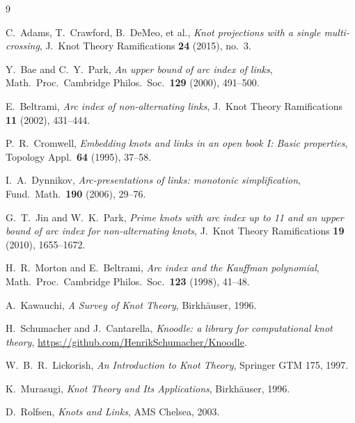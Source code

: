 \documentclass[11pt,oneside]{report}
\theoremstyle{definition}
\begin{document}
\begin{thebibliography}{9}

C.~Adams, T.~Crawford, B.~DeMeo, et al.,
\emph{Knot projections with a single multi-crossing},
J.\ Knot Theory Ramifications \textbf{24} (2015), no.~3.

Y.~Bae and C.~Y.~Park,
\emph{An upper bound of arc index of links},
Math.\ Proc.\ Cambridge Philos.\ Soc.\ \textbf{129} (2000), 491--500.

E.~Beltrami,
\emph{Arc index of non-alternating links},
J.\ Knot Theory Ramifications \textbf{11} (2002), 431--444.

P.~R.~Cromwell,
\emph{Embedding knots and links in an open book I: Basic properties},
Topology Appl.\ \textbf{64} (1995), 37--58.

I.~A.~Dynnikov,
\emph{Arc-presentations of links: monotonic simplification},
Fund.\ Math.\ \textbf{190} (2006), 29--76.

G.~T.~Jin and W.~K.~Park,
\emph{Prime knots with arc index up to 11 and an upper bound of arc index
for non-alternating knots},
J.\ Knot Theory Ramifications \textbf{19} (2010), 1655--1672.

H.~R.~Morton and E.~Beltrami,
\emph{Arc index and the Kauffman polynomial},
Math.\ Proc.\ Cambridge Philos.\ Soc.\ \textbf{123} (1998), 41--48.

A.~Kawauchi,
\emph{A Survey of Knot Theory},
Birkh\"auser, 1996.

H.~Schumacher and J.~Cantarella,
\emph{Knoodle: a library for computational knot theory},
\url{https://github.com/HenrikSchumacher/Knoodle}.

W.~B.~R.~Lickorish,
\emph{An Introduction to Knot Theory},
Springer GTM 175, 1997.

K.~Murasugi,
\emph{Knot Theory and Its Applications},
Birkh\"auser, 1996.

D.~Rolfsen,
\emph{Knots and Links},
AMS Chelsea, 2003.

\end{thebibliography}
\end{document}
